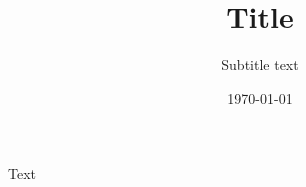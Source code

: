 \documentclass[twoside]{report}
\title{Title}
\subtitle{Subtitle text}
\date{\dddatemmyy\today}
\begin{document}
\maketitle
Text
\end{document}
